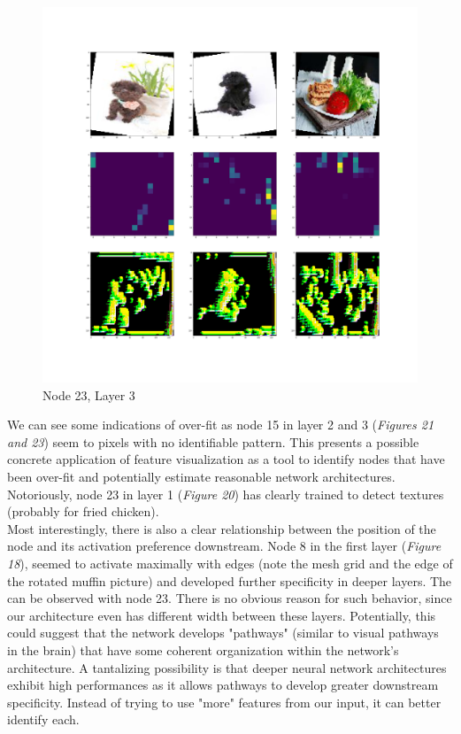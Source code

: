 \documentclass[12pt]{article}
\begin{document}
\begin{figure}[H]
	\centering
	\includegraphics[width=0.7\linewidth]{../diagrams/node23_layer3_DMF}
	\caption{Node 23, Layer 3}
	\label{fig:node23layer3dmf}
\end{figure}

We can see some indications of over-fit as node 15 in layer 2 and 3 (\textit{Figures 21 and 23}) seem to pixels with no identifiable pattern. This presents a possible concrete application of feature visualization as a tool to identify nodes that have been over-fit and potentially estimate reasonable network architectures. \\

Notoriously, node 23 in layer 1 (\textit{Figure 20}) has clearly trained to detect textures (probably for fried chicken). \\

Most interestingly, there is also a clear relationship between the position of the node and its activation preference downstream. Node 8 in the first layer (\textit{Figure 18}), seemed to activate maximally with edges (note the mesh grid and the edge of the rotated muffin picture) and developed further specificity in deeper layers. The can be observed with node 23.  There is no obvious reason for such behavior, since our architecture even has different width between these layers. Potentially, this could suggest that the network develops "pathways" (similar to visual pathways in the brain) that have some coherent organization within the network's architecture. A tantalizing possibility is that deeper neural network architectures exhibit high performances as it allows pathways to develop greater downstream specificity. Instead of trying to use "more" features from our input, it can better identify each. \\
\end{document}

